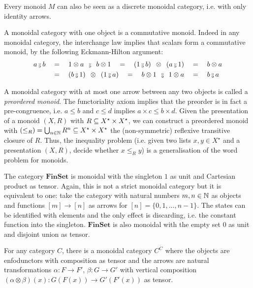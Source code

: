 \begin{example}
Every monoid $M$ can also be seen as a discrete monoidal category, i.e. with only identity arrows.
\end{example}

\begin{example}
A monoidal category with one object is a commutative monoid.
Indeed in any monoidal category, the interchange law implies that scalars form a commutative monoid, by the following Eckmann-Hilton argument:
\begin{align*}
a \fcmp b
&\quad = \quad 1 \otimes a \s \fcmp \s b \otimes 1
\quad = \quad (1 \fcmp b) \s \otimes \s (a \fcmp 1)
\quad = \quad b \otimes a
\\
&\quad = \quad (b \fcmp 1) \s \otimes \s (1 \fcmp a)
\quad = \quad b \otimes 1 \s \fcmp \s 1 \otimes a
\quad = \quad b \fcmp a
\end{align*}
\end{example}

\begin{example}
A monoidal category with at most one arrow between any two objects is called a \emph{preordered monoid}.
The functoriality axiom implies that the preorder is in fact a pre-congruence, i.e. $a \leq b$ and $c \leq d$ implies $a \times c \leq b \times d$.
Given the presentation of a monoid $(X, R)$ with $R \subseteq X^\star \times X^\star$, we can construct a preordered monoid with $(\leq_R) = \bigcup_{n \in \mathbb{N}} R^n \subseteq X^\star \times X^\star$ the (non-symmetric) reflexive transitive closure of $R$.
Thus, the inequality problem (i.e. given two lists $x, y \in X^\star$ and a presentation $(X, R)$, decide whether $x \leq_R y$) is a generalisation of the word problem for monoids.
\end{example}

\begin{example}
The category $\mathbf{FinSet}$ is monoidal with the singleton $1$ as unit and Cartesian product as tensor.
Again, this is not a strict monoidal category but it is equivalent to one: take the category with natural numbers $m, n \in \mathbb{N}$ as objects and functions $[m] \to [n]$ as arrows for $[n] = \{ 0, 1, \dots, n - 1 \}$.
The states can be identified with elements and the only effect is discarding, i.e. the constant function into the singleton.
$\mathbf{FinSet}$ is also monoidal with the empty set $0$ as unit and disjoint union as tensor.
\end{example}

\begin{example}\label{example:endofunctors are monoidal}
For any category $C$, there is a monoidal category $C^C$ where the objects are enfodunctors with composition as tensor and the arrows are natural transformations $\alpha : F \to F'$, $\beta : G \to G'$ with vertical composition $(\alpha \otimes \beta)(x) : G(F(x)) \to G'(F'(x))$ as tensor.
\end{example}

